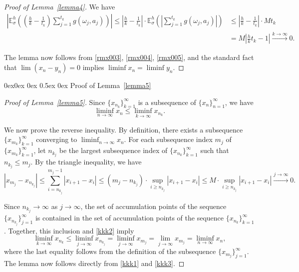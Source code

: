 \documentclass[english,openary,11pt]{article}
\makeatletter
\renewcommand\subsection{\@startsection{subsection}{2}{\z@}%
                                     {0ex\@plus 0ex \@minus 0ex}%
                                     {0.5ex \@plus 0ex}%
                                     {\normalfont\Large\bfseries}}%
\theoremstyle{definition}
\newcommand{\E}{\mathbb{E}}
\makeatother
\begin{document}
\begin{proof}[Proof of Lemma~\ref{lemma4}]
We have
\begin{equation}
\begin{aligned}
\left| \E_{\sigma}^h \left( \left( \frac{h}{k} - \frac{1}{t_k}\right) \sum_{j = 1}^{t_k} g(\omega_j, a_j) \right) \right|
\le 
\left| \frac{h}{k} - \frac{1}{t_k}\right| \cdot \E_{\sigma}^h \left( \left| \sum_{j = 1}^{t_k} g(\omega_j, a_j)  \right| \right)
&\le 
\left| \frac{h}{k} - \frac{1}{t_k}\right| \cdot M t_k \\
&= 
M \left| \frac{h}{k} t_k - 1\right| \xrightarrow{k \to \infty} 0.
\end{aligned}
\label{rmx005}
\end{equation}

The lemma now follows from \eqref{rmx003}, \eqref{rmx004}, \eqref{rmx005}, and the standard fact that $\lim(x_n-y_n) = 0$ implies $\liminf x_n = \liminf y_n$.
\end{proof}

\subsection{Proof of Lemma~\ref{lemma5}}

\begin{proof}[Proof of Lemma~\ref{lemma5}]
Since $\{x_{n_k}\}_{k=1}^\infty$ is a subsequence of $\{x_n\}_{n=1}^\infty$, we have 
\begin{equation}
\liminf_{n \to \infty} x_n \le \liminf_{k \to \infty} x_{n_k}.
\label{kkk1}
\end{equation}

We now prove the reverse inequality. By definition, there exists a subsequence $\{x_{m_k}\}_{k=1}^\infty$ converging to $\liminf_{n \to \infty} x_n$. For each subsequence index $m_j$ of $\{x_{m_k}\}_{k=1}^\infty$, let $n_{k_j}$ be the largest subsequence index of $\{x_{n_k}\}_{k=1}^\infty$ such that $n_{k_j} \le m_j$. By the triangle inequality, we have
\begin{equation}
|x_{m_j} - x_{n_{k_j}}| \le \sum_{i = n_{k_j}}^{m_j - 1} |x_{i+1} - x_i| \le (m_j - n_{k_j}) \cdot \sup_{i \ge n_{k_j}} |x_{i+1} - x_i| \le M \cdot \sup_{i \ge n_{k_j}} |x_{i+1} - x_i| \xrightarrow{j \to \infty} 0.
\label{kkk2}
\end{equation}

Since $n_{k_j} \to \infty$ as $j \to \infty$, the set of accumulation points of the sequence $\{x_{n_{k_j}}\}_{j=1}^\infty$  is contained in the set of accumulation points of the sequence $\{x_{n_{k}}\}_{k=1}^\infty$. Together, this inclusion and \eqref{kkk2} imply
\begin{equation}
\liminf_{k \to \infty} x_{n_k} \le \liminf_{j \to \infty} x_{n_{k_j}} = \liminf_{j \to \infty} x_{m_j} = \lim_{j \to \infty} x_{m_j} = \liminf_{n \to \infty} x_n,
\label{kkk3}
\end{equation}
where the last equality follows from the definition of the subsequence $\{x_{m_j}\}_{j=1}^\infty$. The lemma now follows directly from \eqref{kkk1} and \eqref{kkk3}.
\end{proof}
\end{document}

